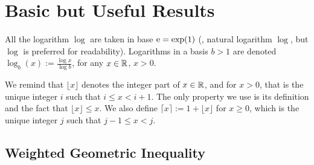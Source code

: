 \documentclass[12pt]{colt2018} %
\begin{document}
%


\hr{}

\section{Basic but Useful Results}\label{sec:otherproofs}

All the logarithm $\log$ are taken in base $\mathrm{e} = \exp(1)$ (\ie, natural logarithm $\log$, but $\log$ is preferred for readability).
Logarithms in a basis $b > 1$ are denoted $\log_b(x) := \frac{\log x}{\log b}$, for any $x\in\mathbb{R}$, $x>0$.

We remind that $\lfloor x \rfloor$ denotes the integer part of $x\in\mathbb{R}$, and for $x>0$, that is
the unique integer $i$ such that $i \leq x < i + 1$.
The only property we use is its definition and the fact that $\lfloor x \rfloor \leq x$.
We also define $\lceil x \rceil := 1 + \lfloor x \rfloor$ for $x \geq 0$, which is the unique integer $j$ such that $j-1 \leq x < j$.


\subsection{Weighted Geometric Inequality}

\end{document}
